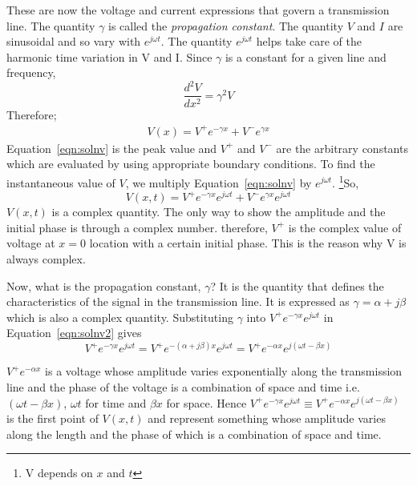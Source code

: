 These are now the voltage and current expressions that govern a transmission line. The quantity $ \gamma $ is called the \emph{propagation constant}. The quantity $V$ and $I$ are sinusoidal and so vary with $e^{j\omega t}$. The quantity $e^{j\omega t}$ helps take care of the harmonic time variation in V and I. 
Since $\gamma$ is a constant for a given line and frequency, 
\[\frac{d^{2}V}{dx^{2}} = \gamma^{2}V\]
Therefore; 
\begin{align}
V(x) = V^{+} e ^{- \gamma x} + V^{-}e^{\gamma x}  
\label{eqn:solnv}
\end{align}
Equation~\eqref{eqn:solnv} is the peak value and $V^+$ and $V^-$ are the arbitrary constants which are evaluated by using appropriate boundary conditions. To find the instantaneous value of $V$, we multiply Equation~\eqref{eqn:solnv} by $e^{j\omega t}$. \footnote{V depends on $x$ and $t$}So,
\begin{dmath}
V(x,t) = V^{+} e^{-\gamma x}e^{j\omega t} + V^{-} e^{\gamma x}e^{j\omega t}
\label{eqn:solnv2}
\end{dmath}
$V(x,t)$ is a complex quantity. The only way to show the amplitude and the initial phase is through a complex number. therefore, $ V^{+}$ is the complex value of voltage at $x=0$ location with a certain initial phase. This is the reason why V is always complex. 

Now, what is the propagation constant, $\gamma$? It is the quantity that defines the characteristics of the signal in the transmission line. It is expressed as $ \gamma = \alpha + j\beta $	 which is also a complex quantity. Substituting $\gamma$ into $V^{+}e^{- \gamma x}e^{j \omega t}$ in Equation~\eqref{eqn:solnv2} gives
\begin{dmath}
V^{+}e^{- \gamma x}e^{j \omega t} = V^{+}e^{-( \alpha + j \beta )x}e^{j \omega t} = V^{+}e^{-\alpha x}e^{j(\omega t - \beta x)}
\end{dmath}

$ V^{+}e^{-\alpha x} $ is a voltage whose amplitude varies exponentially along the transmission line and the phase of the voltage is a combination of space and time i.e. $  (\omega t- \beta x) $, $ \omega t $ for time and $ \beta x  $ for space. Hence $ V^{+}e^{-\gamma x}e^{j\omega t} \equiv V^{+}e^{-\alpha x}e^{j(\omega t-\beta x)} $ is the first point of $V(x,t)$ and represent something whose amplitude varies along the length and the phase of which is a combination of space and time.

